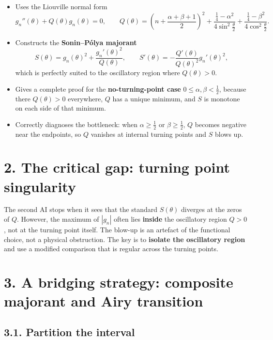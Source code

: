 \documentclass[11pt]{article}
\begin{document}
\begin{itemize}
\item Uses the Liouville normal form
\begin{equation*}
g_n''(\theta)+Q(\theta)g_n(\theta)=0,
\qquad
Q(\theta)=\left(n+\frac{\alpha+\beta+1}{2}\right)^2
+\frac{\frac14-\alpha^2}{4\sin^2\frac{\theta}{2}}
+\frac{\frac14-\beta^2}{4\cos^2\frac{\theta}{2}}.
\end{equation*}
\item Constructs the \textbf{Sonin--P\'olya majorant}
\begin{equation*}
S(\theta)=g_n(\theta)^2+\frac{g_n'(\theta)^2}{Q(\theta)},
\qquad
S'(\theta)=-\frac{Q'(\theta)}{Q(\theta)^2}g_n'(\theta)^2,
\end{equation*}
which is perfectly suited to the oscillatory region where \(Q(\theta)>0\).
\item Gives a complete proof for the \textbf{no-turning-point case} \(0\le\alpha,\beta<\frac12\), because there \(Q(\theta)>0\) everywhere, \(Q\) has a unique minimum, and \(S\) is monotone on each side of that minimum.
\item Correctly diagnoses the bottleneck: when \(\alpha\ge\frac12\) or \(\beta\ge\frac12\), \(Q\) becomes negative near the endpoints, so \(Q\) vanishes at internal turning points and \(S\) blows up.
\end{itemize}

\section*{2. The critical gap: turning point singularity}

The second AI stops when it sees that the standard \(S(\theta)\) diverges at the zeros of \(Q\). However, the maximum of \(|g_n|\) often lies \textbf{inside} the oscillatory region \(Q>0\), not at the turning point itself. The blow-up is an artefact of the functional choice, not a physical obstruction. The key is to \textbf{isolate the oscillatory region} and use a modified comparison that is regular across the turning points.

\section*{3. A bridging strategy: composite majorant and Airy transition}

\subsection*{3.1. Partition the interval}
\end{document}
